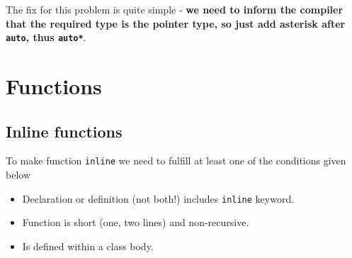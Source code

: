 \documentclass[../main]{subfiles}
\begin{document}
    The fix for this problem is quite simple - \textbf{we need to inform the compiler that the required type is the pointer type,
so just add asterisk after \texttt{auto}, thus \texttt{auto*}}.

\section{Functions}
\subsection{Inline functions}
    To make function \texttt{inline} we need to fulfill at least one of the conditions given below
\begin{itemize}
    \item Declaration or definition (not both!) includes \texttt{inline} keyword.
    \item Function is short (one, two lines) and non-recursive.
    \item Is defined within a class body.
\end{itemize}
\end{document}
